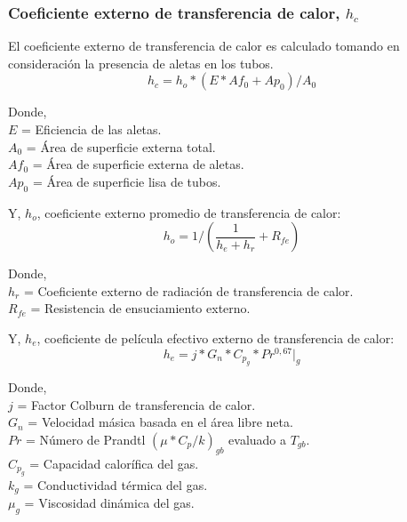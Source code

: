 \subsubsection{Coeficiente externo de transferencia de calor, $h_{c}$}
\par El coeficiente externo de transferencia de calor es calculado tomando en consideración la presencia de aletas en los tubos.
\begin{equation}
h_{c} = h_o * (E *Af_0 +Ap_0) / A_0
\end{equation}

\par Donde,\\
$E$ = Eficiencia de las aletas.\\
$A_0$ = Área de superficie externa total.\\
$Af_0$ = Área de superficie externa de aletas. \\
$Ap_0$ = Área de superficie lisa de tubos.
\par Y, $h_o$, coeficiente externo promedio de transferencia de calor: 
\begin{equation}
h_o = 1/(\frac{1}{h_e+h_r}+R_{fe})
\end{equation}

\par Donde,\\
$h_r$ = Coeficiente externo de radiación de transferencia de calor.\\
$R_{fe}$ = Resistencia de ensuciamiento externo.
\par Y, $h_e$, coeficiente de película efectivo externo de transferencia de calor: 
\begin{equation}
h_e = j *G_n *C_{p_g} *Pr^{0,67}|_g
\end{equation}

\par Donde,\\
$j$ = Factor Colburn de transferencia de calor.\\
$G_n$ = Velocidad másica basada en el área libre neta.\\
$Pr$ = Número de Prandtl $(\mu*C_p /k)_{gb}$ evaluado a $T_{gb}$.\\
$C_{p_g}$ = Capacidad calorífica del gas.\\
$k_g$ = Conductividad térmica del gas.\\
$\mu_g$ = Viscosidad dinámica del gas.

